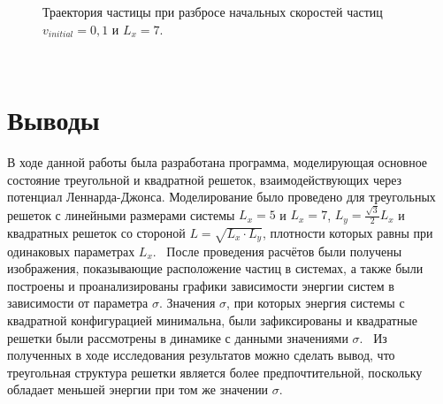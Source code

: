 \documentclass[14pt,a4paper,report]{ncc}
\begin{document}
\begin{figure}[tbp]
\caption{Траектория частицы при разбросе начальных скоростей частиц $v_{initial} = 0,1$ и  $L_x=7$.}
\label{ris:image18}
\end{figure}

\


\newpage\section{Выводы}
В ходе данной работы была разработана программа, моделирующая основное состояние треугольной и квадратной решеток, взаимодействующих через потенциал Леннарда-Джонса. Моделирование было проведено для треугольных решеток с линейными размерами системы $L_x=5$ и $L_x=7$, $L_y=\frac{\sqrt{3}}{2} L_x$ и квадратных решеток со стороной $L=\sqrt{L_x \cdot L_y}$, плотности которых равны при одинаковых параметрах $L_x$. 
\
После проведения расчётов были получены изображения,
показывающие расположение частиц в системах, а также были построены и проанализированы графики зависимости энергии систем в зависимости от параметра $\sigma$. Значения $\sigma$, при которых энергия системы с квадратной конфигурацией минимальна, были зафиксированы и квадратные решетки были рассмотрены в динамике с данными значениями $\sigma$. 
\
Из полученных в ходе исследования результатов можно сделать вывод, что треугольная структура решетки является более предпочтительной, поскольку обладает меньшей энергии при том же значении $\sigma$. 
\end{document}
